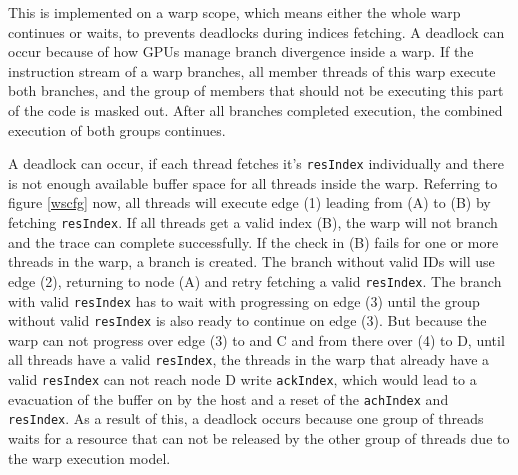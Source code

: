	
	This is implemented on a warp scope, which means either the whole warp continues or waits, to prevents deadlocks during indices fetching.
	A deadlock can occur because of how GPUs manage branch divergence inside a warp. If the instruction stream of a warp branches, all member threads of this warp execute both branches, and the group of members that should not be executing this part of the code is masked out. After all branches completed execution, the combined execution of both groups continues.
	
	A deadlock can occur, if each thread fetches it's \verb|resIndex| individually and there is not enough available buffer space for all threads inside the warp. Referring to figure \ref{wscfg} now, all threads will execute edge (1) leading from (A) to (B) by fetching \verb|resIndex|. If all threads get a valid index (B), the warp will not branch and the trace can complete successfully.
	If the check in (B) fails for one or more threads in the warp, a branch is created. The branch without valid IDs will 
	use edge (2), returning to node (A) and retry fetching a valid \verb|resIndex|. The branch with valid \verb|resIndex|
	has to wait with progressing on edge (3) until the group without valid \verb|resIndex| is also ready to continue on edge (3).
	But because the warp can not progress over edge (3) to and C and from there over (4) to D, until all threads have a valid \verb|resIndex|, the threads in the warp that already have a valid \verb|resIndex| can not reach node D write \verb|ackIndex|, which would lead to a evacuation of the buffer on by the host and a reset of the \verb|achIndex| and \verb|resIndex|. As a result of this, a deadlock occurs because one group of threads waits for a resource that can not be released by the other group
	of threads due to the warp execution model.
	
